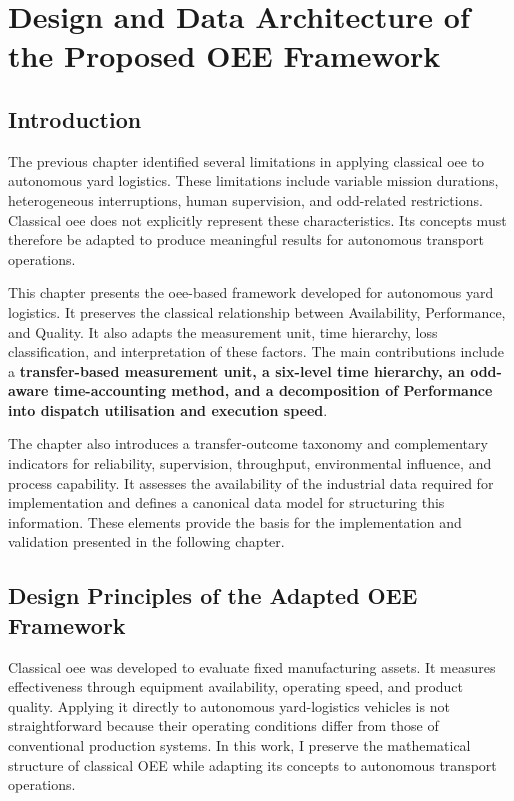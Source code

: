 
\chapter{Design and Data Architecture of the Proposed OEE Framework}
\label{chap:oee-framework-design}

\section{Introduction}

The previous chapter identified several limitations in applying classical \gls{oee} to autonomous yard logistics. These limitations include variable mission durations, heterogeneous interruptions, human supervision, and \gls{odd}-related restrictions. Classical \gls{oee} does not explicitly represent these characteristics. Its concepts must therefore be adapted to produce meaningful results for autonomous transport operations.

This chapter presents the \gls{oee}-based framework developed for autonomous yard logistics. It preserves the classical relationship between Availability, Performance, and Quality. It also adapts the measurement unit, time hierarchy, loss classification, and interpretation of these factors. The main contributions include a \textbf{transfer-based measurement unit, a six-level time hierarchy, an \gls{odd}-aware time-accounting method, and a decomposition of Performance into dispatch utilisation and execution speed}.

The chapter also introduces a transfer-outcome taxonomy and complementary indicators for reliability, supervision, throughput, environmental influence, and process capability. It assesses the availability of the industrial data required for implementation and defines a canonical data model for structuring this information. These elements provide the basis for the implementation and validation presented in the following chapter.
\section{Design Principles of the Adapted OEE Framework}
\label{sec:pwd_context}

Classical \gls{oee} was developed to evaluate fixed manufacturing assets. It measures effectiveness through equipment availability, operating speed, and product quality. Applying it directly to autonomous yard-logistics vehicles is not straightforward because their operating conditions differ from those of conventional production systems. In this work, I preserve the mathematical structure of classical OEE while adapting its concepts to autonomous transport operations.

